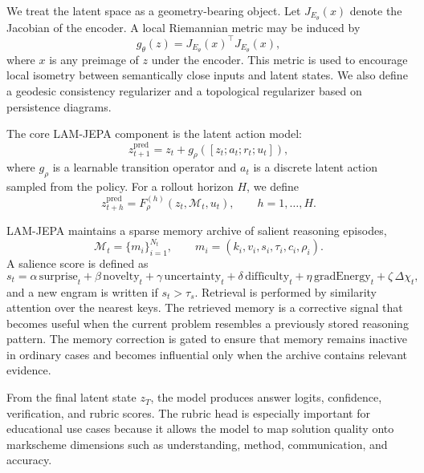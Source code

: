 \documentclass[11pt]{article}
\newcommand{\1}{\mathbbm{1}}
\begin{document}
We treat the latent space as a geometry-bearing object. Let $J_{E_\theta}(x)$ denote the Jacobian of the encoder. A local Riemannian metric may be induced by
\begin{equation}
g_\theta(z) = J_{E_\theta}(x)^\top J_{E_\theta}(x),
\end{equation}
where $x$ is any preimage of $z$ under the encoder. This metric is used to encourage local isometry between semantically close inputs and latent states. We also define a geodesic consistency regularizer and a topological regularizer based on persistence diagrams.

The core LAM-JEPA component is the latent action model:
\begin{equation}
z_{t+1}^{\mathrm{pred}} = z_t + g_\rho([z_t; a_t; r_t; u_t]),
\end{equation}
where $g_\rho$ is a learnable transition operator and $a_t$ is a discrete latent action sampled from the policy. For a rollout horizon $H$, we define
\begin{equation}
z_{t+h}^{\mathrm{pred}} = F_\rho^{(h)}(z_t,\mathcal{M}_t,u_t), 
\qquad h = 1,\dots,H.
\end{equation}

LAM-JEPA maintains a sparse memory archive of salient reasoning episodes,
\begin{equation}
\mathcal{M}_t = \{m_i\}_{i=1}^{N_t}, 
\qquad
m_i = (k_i, v_i, s_i, \tau_i, c_i, \rho_i).
\end{equation}
A salience score is defined as
\begin{equation}
s_t = \alpha\,\mathrm{surprise}_t 
+ \beta\,\mathrm{novelty}_t
+ \gamma\,\mathrm{uncertainty}_t
+ \delta\,\mathrm{difficulty}_t
+ \eta\,\mathrm{gradEnergy}_t
+ \zeta\,\Delta \chi_t,
\end{equation}
and a new engram is written if $s_t > \tau_s$. Retrieval is performed by similarity attention over the nearest keys. The retrieved memory is a corrective signal that becomes useful when the current problem resembles a previously stored reasoning pattern. The memory correction is gated to ensure that memory remains inactive in ordinary cases and becomes influential only when the archive contains relevant evidence.

From the final latent state $z_T$, the model produces answer logits, confidence, verification, and rubric scores. The rubric head is especially important for educational use cases because it allows the model to map solution quality onto markscheme dimensions such as understanding, method, communication, and accuracy.
\end{document}
